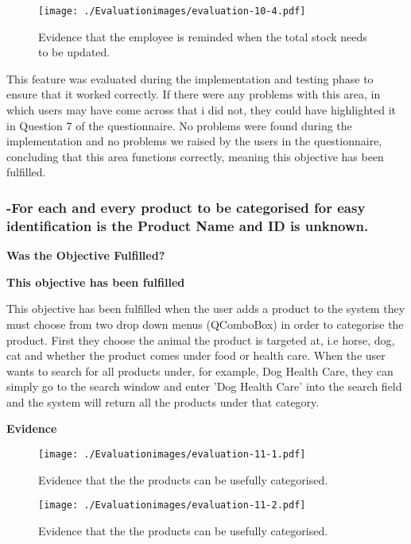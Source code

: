\begin{figure}[H]
\caption{Evidence that the employee is reminded when the total stock needs to be updated.} \label{fig:evaluation-10-4}
\hfill\texttt{[image: ./Evaluationimages/evaluation-10-4.pdf]}
\end{figure}

This feature was evaluated during the implementation and testing phase to ensure that it worked correctly. If there were any problems with this area, in which users may have come across that i did not, they could have highlighted it in Question 7 of the questionnaire. No problems were found during the implementation and no problems we raised by the users in the questionnaire, concluding that this area functions correctly, meaning this objective has been fulfilled.


\pagebreak
\subsubsection{-For each and every product to be categorised for easy identification is the Product Name and ID is unknown.}
\textbf{Was the Objective Fulfilled?} \newline

\textbf{\large{This objective has been fulfilled}}

This objective has been fulfilled when the user adds a product to the system they must choose from two drop down menus (QComboBox) in order to categorise the product. First they choose the animal the product is targeted at, i.e horse, dog, cat and whether the product comes under food or health care. When the user wants to search for all products under, for example, Dog Health Care, they can simply go to the search window and enter 'Dog Health Care' into the search field and the system will return all the products under that category.

\textbf{Evidence} \newline
\label{category-evidence}

\begin{figure}[H]
\caption{Evidence that the the products can be usefully categorised.} \label{fig:evaluation-11-1}
\hfill\texttt{[image: ./Evaluationimages/evaluation-11-1.pdf]}
\end{figure}

\begin{figure}[H]
\caption{Evidence that the the products can be usefully categorised.} \label{fig:evaluation-11-2}
\hfill\texttt{[image: ./Evaluationimages/evaluation-11-2.pdf]}
\end{figure}

